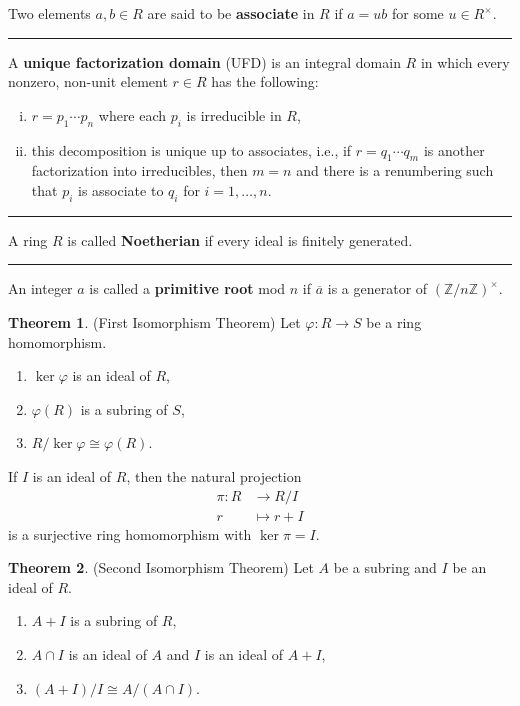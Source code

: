 \documentclass[12pt]{article}
\newcommand{\keyword}[1]{\textbf{#1}}
\newcommand{\sepline}{\rule{\textwidth}{0.4pt}}
\theoremstyle{definition}
\newtheorem{theorem}{Theorem}
\newcommand{\Z}{\mathbb{Z}}
\renewcommand{\phi}{\varphi}
\newcommand{\<}{\left\langle}
\renewcommand{\>}{\right\rangle}
\newcommand{\isom}{\cong}
\newcommand{\eqc}{\overline}
\begin{document}
Two elements $a, b \in R$ are said to be \keyword{associate} in $R$ if $a = ub$ for some $u \in R^\times$.

\sepline

A \keyword{unique factorization domain} (UFD) is an integral domain $R$ in which every nonzero, non-unit element $r \in R$ has the following:
\begin{enumerate}[(i)]
    \item $r = p_1 \cdots p_n$ where each $p_i$ is irreducible in $R$,
    \item this decomposition is unique up to associates, i.e., if $r = q_1 \cdots q_m$ is another factorization into irreducibles, then $m = n$ and there is a renumbering such that $p_i$ is associate to $q_i$ for $i = 1, \dots, n$.
\end{enumerate}

\sepline

A ring $R$ is called \keyword{Noetherian} if every ideal is finitely generated.

\sepline

An integer $a$ is called a \keyword{primitive root} mod $n$ if $\eqc{a}$ is a generator of $(\Z/n\Z)^\times$.

\newpage


\begin{theorem}(First Isomorphism Theorem)
    Let $\phi : R \to S$ be a ring homomorphism.
    \begin{enumerate}
        \item $\ker \phi$ is an ideal of $R$,
        \item $\phi(R)$ is a subring of $S$,
        \item $R/\ker\phi \isom \phi(R)$.
    \end{enumerate}
    
    
    If $I$ is an ideal of $R$, then the natural projection
    \begin{align*}
        \pi : R &\to R/I \\
            r &\mapsto r + I
    \end{align*}
    is a surjective ring homomorphism with $\ker\pi = I$.
\end{theorem}

\begin{theorem}(Second Isomorphism Theorem)
    Let $A$ be a subring and $I$ be an ideal of $R$.
    \begin{enumerate}
        \item $A + I$ is a subring of $R$,
        \item $A \cap I$ is an ideal of $A$ and $I$ is an ideal of $A + I$,
        \item $(A + I)/I \isom A/(A \cap I)$.
    \end{enumerate}
\end{theorem}
\end{document}
